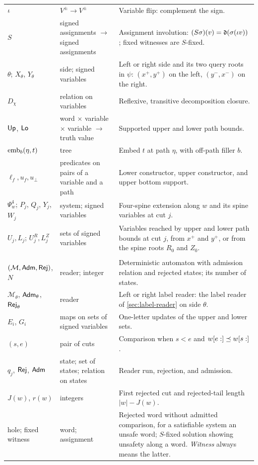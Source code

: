 \begin{longtable}{@{}>{\raggedright\arraybackslash}p{.21\linewidth}>{\raggedright\arraybackslash}p{.28\linewidth}>{\raggedright\arraybackslash}p{.44\linewidth}@{}}
$\iota$ & $V^\pm\to V^\pm$ & Variable flip: complement the sign.\\
$S$ & signed assignments $\to$ signed assignments & Assignment involution: $(S\sigma)(v)=\mathfrak d(\sigma(\iota v))$; fixed witnesses are $S$-fixed.\\
$\theta$; $X_\theta$, $Y_\theta$ & side; signed variables & Left or right side and its two query roots in $\psi$: $(x^+,y^+)$ on the left, $(y^-,x^-)$ on the right.\\
$D_\chi$ & relation on variables & Reflexive, transitive decomposition closure.\\
$\mathsf{Up}$, $\mathsf{Lo}$ & word $\times$ variable $\times$ variable $\to$ truth value & Supported upper and lower path bounds.\\
$\operatorname{emb}_b(\eta,t)$ & tree & Embed $t$ at path $\eta$, with off-path filler $b$.\\
$\ell_f,u_f,u_\bot$ & predicates on pairs of a variable and a path & Lower constructor, upper constructor, and upper bottom support.\\
$\Psi^4_w$; $P_j$, $Q_j$, $Y_j$, $W_j$ & system; signed variables & Four-spine extension along $w$ and its spine variables at cut $j$.\\
$U_j,L_j$; $U^R_j,L^Z_j$ & sets of signed variables & Variables reached by upper and lower path bounds at cut $j$, from $x^+$ and $y^+$, or from the spine roots $R_0$ and $Z_0$.\\
\midrule
\multicolumn{3}{@{}l}{\emph{Readers and holes (\cref{sec:holes,sec:tail,sec:depth,sec:decision})}}\\
$(\mathcal M,\mathsf{Adm},\mathsf{Rej})$, $N$ & reader; integer & Deterministic automaton with admission relation and rejected states; its number of states.\\
$\mathcal M_\theta$, $\mathsf{Adm}_\theta$, $\mathsf{Rej}_\theta$ & reader & Left or right label reader: the label reader of \cref{sec:label-reader} on side $\theta$.\\
$E_i$, $G_i$ & maps on sets of signed variables & One-letter updates of the upper and lower sets.\\
$(s,e)$ & pair of cuts & Comparison when $s<e$ and $w[e:]\preceq w[s:]$.\\
$q_j$, $\mathsf{Rej}$, $\mathsf{Adm}$ & state; set of states; relation on states & Reader run, rejection, and admission.\\
$J(w)$, $r(w)$ & integers & First rejected cut and rejected-tail length $|w|-J(w)$.\\
hole; fixed witness & word; assignment & Rejected word without admitted comparison, for a satisfiable system an unsafe word; $S$-fixed solution showing unsafety along a word. \emph{Witness} always means the latter.\\

\end{longtable}
